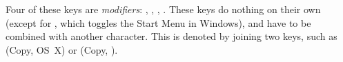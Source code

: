Four of these keys are \textit{modifiers}: \commandkey , \shiftkey , \controlkey , \optionkey .  These keys do nothing on their own (except for \commandkey, which toggles the \textsf{Start Menu} in Windows), and have to be combined with another character.  This is denoted by joining two keys, such as  (Copy, \textsf{OS~X}) or   (Copy, ).




